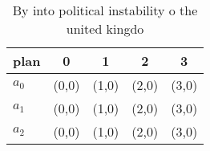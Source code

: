 \documentclass[a4paper]{article}
\begin{document}
\begin{table}
\begin{adjustbox}{width=0.6\columnwidth}
\begin{tabular}{|l|l|l|l|l|}
\hline
\textbf{plan} & \multicolumn{1}{c|}{\textbf{0}} & \multicolumn{1}{c|}{\textbf{1}} & \multicolumn{1}{c|}{\textbf{2}} & \multicolumn{1}{c|}{\textbf{3}} \\ \hline
\textbf{$a_0$}  & (0,0) & (1,0) & (2,0) & (3,0) \\ \hline
\textbf{$a_1$}  & (0,0) & (1,0) & (2,0) & (3,0) \\ \hline
\textbf{$a_2$}  & (0,0) & (1,0) & (2,0) & (3,0) \\ \hline
\end{tabular}
\end{adjustbox}
\caption{By into political instability o the united kingdo
}
\end{table}
\end{document}
